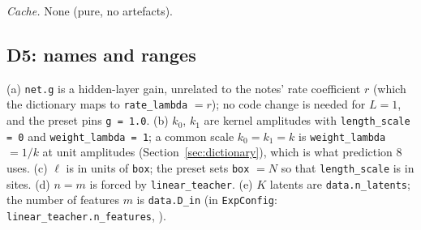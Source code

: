 \documentclass[11pt,a4paper]{article}
\newcommand{\code}[1]{\texttt{#1}}
\begin{document}
\emph{Cache.} None (pure, no artefacts).

\subsection{D5: names and ranges}
\label{sec:D5}
(a) \code{net.g} is a hidden-layer gain, unrelated to the notes' rate coefficient $r$ (which the dictionary maps to \code{rate\_lambda} $= r$); no code change is needed for $L = 1$, and the preset pins \code{g = 1.0}. (b) $k_0$, $k_1$ are kernel amplitudes with \code{length\_scale = 0} and \code{weight\_lambda = 1}; a common scale $k_0 = k_1 = k$ is \code{weight\_lambda} $= 1/k$ at unit amplitudes (Section~\ref{sec:dictionary}), which is what prediction 8 uses. (c) $\ell$ is in units of \code{box}; the preset sets \code{box} $= N$ so that \code{length\_scale} is in sites. (d) $n = m$ is forced by \code{linear\_teacher}. (e) $K$ latents are \code{data.n\_latents}; the number of features $m$ is \code{data.D\_in} (in \code{ExpConfig}: \code{linear\_teacher.n\_features}, ).
\end{document}

